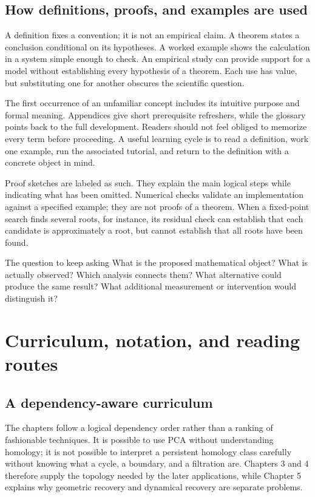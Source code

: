 \section*{How definitions, proofs, and examples are used}
A definition fixes a convention; it is not an empirical claim. A theorem states a conclusion conditional on its hypotheses. A worked example shows the calculation in a system simple enough to check. An empirical study can provide support for a model without establishing every hypothesis of a theorem. Each use has value, but substituting one for another obscures the scientific question.

The first occurrence of an unfamiliar concept includes its intuitive purpose and formal meaning. Appendices give short prerequisite refreshers, while the glossary points back to the full development. Readers should not feel obliged to memorize every term before proceeding. A useful learning cycle is to read a definition, work one example, run the associated tutorial, and return to the definition with a concrete object in mind.

Proof sketches are labeled as such. They explain the main logical steps while indicating what has been omitted. Numerical checks validate an implementation against a specified example; they are not proofs of a theorem. When a fixed-point search finds several roots, for instance, its residual check can establish that each candidate is approximately a root, but cannot establish that all roots have been found.

\begin{insight}{The question to keep asking}
What is the proposed mathematical object? What is actually observed? Which analysis connects them? What alternative could produce the same result? What additional measurement or intervention would distinguish it?
\end{insight}

\chapter*{Curriculum, notation, and reading routes}
\section*{A dependency-aware curriculum}
The chapters follow a logical dependency order rather than a ranking of fashionable techniques. It is possible to use PCA without understanding homology; it is not possible to interpret a persistent homology class carefully without knowing what a cycle, a boundary, and a filtration are. Chapters 3 and 4 therefore supply the topology needed by the later applications, while Chapter 5 explains why geometric recovery and dynamical recovery are separate problems.

